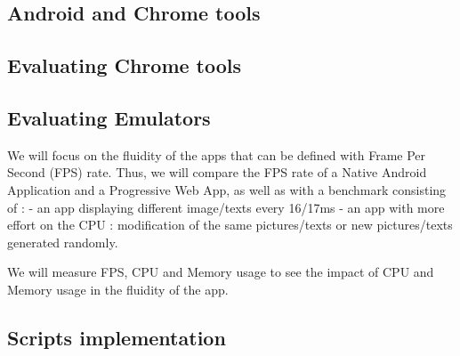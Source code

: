     \subsection{Android and Chrome tools}
    \subsection{Evaluating Chrome tools}
    \subsection{Evaluating Emulators}

We will focus on the fluidity of the apps that can be defined with Frame Per Second (FPS) rate.
Thus, we will compare the FPS rate of a Native Android Application and a Progressive Web App, as well as with a benchmark consisting of : 
    - an app displaying different image/texts every 16/17ms
    - an app with more effort on the CPU : modification of the same pictures/texts or new pictures/texts generated randomly.
\newline

We will measure FPS, CPU and Memory usage to see the impact of CPU and Memory usage in the fluidity of the app.
\newline

\subsection{Scripts implementation}

